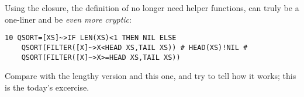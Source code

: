 Using the closure, the definition of  no longer need helper functions, can truly be a one-liner and be \emph{even more cryptic}:

\begin{lstlisting}
10 QSORT=[XS]~>IF LEN(XS)<1 THEN NIL ELSE 
    QSORT(FILTER([X]~>X<HEAD XS,TAIL XS)) # HEAD(XS)!NIL # 
    QSORT(FILTER([X]~>X>=HEAD XS,TAIL XS))
\end{lstlisting}

Compare with the lengthy version and this one, and try to tell how it works; this is the today's excercise.
